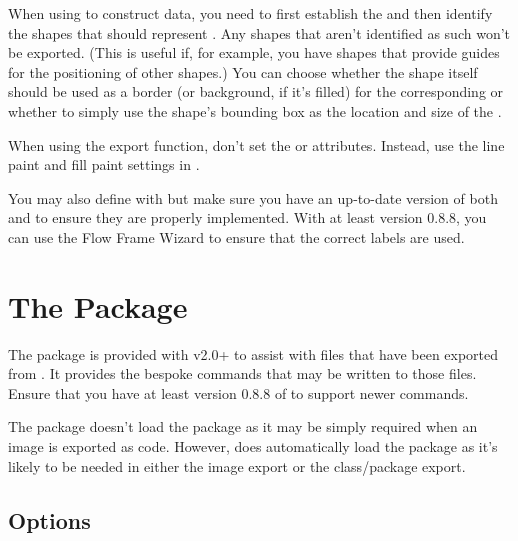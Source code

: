 \documentclass[fontsize=12pt]{scrbook}
\begin{document}
When using  to construct  data, you
need to first establish the  and then identify the
shapes that should represent . Any shapes that aren't
identified as such won't be exported. (This is useful if, for
example, you have shapes that provide guides for the positioning of 
other shapes.) You can choose whether the shape itself should be used as a
border (or background, if it's filled) for the corresponding  
or whether to simply use the shape's bounding box as the location 
and size of the .

\begin{information}
When using the  export function, don't set the
 or  attributes. Instead, 
use the line paint and fill paint settings in .
\end{information}

You may also define  with 
but make sure you have an up-to-date version of both 
and  to ensure they are properly implemented.
With at least  version 0.8.8, you can use the Flow
Frame Wizard to ensure that the correct labels are used.

\section{The  Package}
\label{sec:flowframtkutils}


The  package is provided with 
v2.0+ to assist with files that have been exported from .
It provides the bespoke commands that may be written to those files.
Ensure that you have at least version 0.8.8 of   
to support newer commands.

\begin{information}
The  package doesn't load the 
package as it may be simply required when
an image is exported as  code. However,
 does automatically load the  package
as it's likely to be needed in either the image export or
the class\slash package export.
\end{information}

\subsection{Options}\label{sec:flowframtkutilsopts}
\end{document}
